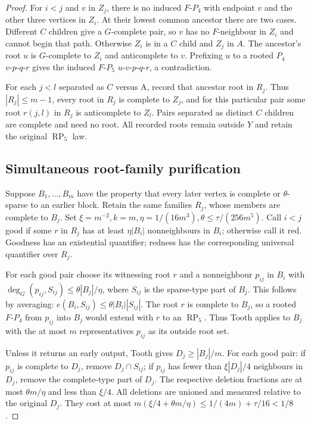 \documentclass[11pt,a4paper]{article}
\theoremstyle{definition}
\theoremstyle{remark}
\numberwithin{equation}{section}
\begin{document}
\begin{proof}
For \(i<j\) and \(v\) in \(Z_{j}\), there is no induced \(F\text{-}P_{4}\) with endpoint \(v\) and the other three vertices in \(Z_{i}\). At their lowest common ancestor there are two cases. Different \(C\) children give a \(G\)-complete pair, so \(v\) has no \(F\)-neighbour in \(Z_{i}\) and cannot begin that path. Otherwise \(Z_{i}\) is in a \(C\) child and \(Z_{j}\) in \(A\). The ancestor's root \(u\) is \(G\)-complete to \(Z_{i}\) and anticomplete to \(v\). Prefixing \(u\) to a rooted \(P_{4}\) \(v\text{-}p\text{-}q\text{-}r\) gives the induced \(F\text{-}P_{5}\) \(u\text{-}v\text{-}p\text{-}q\text{-}r\), a contradiction.

For each \(j<l\) separated as \(C\) versus A, record that ancestor root in \(R_{j}\). Thus \(|R_{j}|\le\allowbreak m-1\), every root in \(R_{j}\) is complete to \(Z_{j}\), and for this particular pair some root \(r(j,\allowbreak l)\) in \(R_{j}\) is anticomplete to \(Z_{l}\). Pairs separated as distinct \(C\) children are complete and need no root. All recorded roots remain outside \(Y\) and retain the original \(\operatorname{RP}_{5}\) law.
\subsection{Simultaneous root-family purification}\label{subsec:rp5-purification}
Suppose \(B_{1},\ldots,B_{m}\) have the property that every later vertex is complete or \(\theta\)-sparse to an earlier block. Retain the same families \(R_{j}\), whose members are complete to \(B_{j}\). Set \(\xi=m^{-2},\allowbreak  k=m,\allowbreak  \eta=1/(16m^{3}),\allowbreak  \theta\le\allowbreak \tau/(256m^{5})\). Call \(i<j\) good if some \(r\) in \(R_{j}\) has at least \(\eta|B_{i}|\) nonneighbours in \(B_{i}\); otherwise call it red. Goodness has an existential quantifier; redness has the corresponding universal quantifier over \(R_{j}\).

For each good pair choose its witnessing root \(r\) and a nonneighbour \(p_{ij}\) in \(B_{i}\) with \(\deg _{G}(p_{ij},\allowbreak S_{ij})\le\allowbreak \theta|B_{j}|/\eta\), where \(S_{ij}\) is the sparse-type part of \(B_{j}\). This follows by averaging: \(e(B_{i},\allowbreak S_{ij})\le\allowbreak \theta|B_{i}||S_{ij}|\). The root \(r\) is complete to \(B_{j}\), so a rooted \(F\text{-}P_{4}\) from \(p_{ij}\) into \(B_{j}\) would extend with \(r\) to an \(\operatorname{RP}_{5}\). Thus Tooth applies to \(B_{j}\) with the at most \(m\) representatives \(p_{ij}\) as its outside root set.

Unless it returns an early output, Tooth gives \(D_{j}\ge\allowbreak |B_{j}|/m\). For each good pair: if \(p_{ij}\) is complete to \(D_{j}\), remove \(D_{j} \cap  S_{ij}\); if \(p_{ij}\) has fewer than \(\xi|D_{j}|/4\) neighbours in \(D_{j}\), remove the complete-type part of \(D_{j}\). The respective deletion fractions are at most \(\theta m/\eta\) and less than \(\xi/4\). All deletions are unioned and measured relative to the original \(D_{j}\). They cost at most \(m(\xi/4+\theta m/\eta)\le\allowbreak 1/(4m)+\tau/16<1/8\).


\end{proof}
\end{document}
